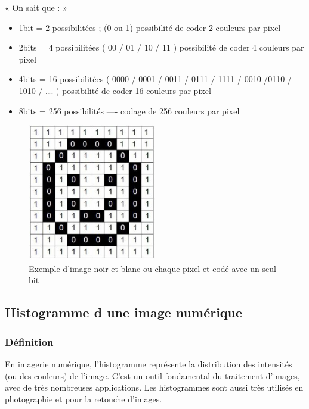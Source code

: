 \documentclass[a4paper,12pt]{report}
\begin{document}
« On sait que : »
\begin{itemize}
	\item 1bit = 2 possibilitées ; (0 ou 1) possibilité de coder 2 couleurs par pixel\\
	\item 2bits = 4 possibilitées ( 00 / 01 / 10 / 11 ) possibilité de coder 4 couleurs par pixel\\
	\item 4bits = 16 possibilitées ( 0000 / 0001 / 0011 / 0111 / 1111 / 0010 /0110 / 1010 /  …. ) possibilité de coder 16 couleurs par pixel\\
	\item 8bits = 256 possibilités —- codage de 256 couleurs par pixel\\
\end{itemize}

\begin{figure}[ht]
	\centering
	\includegraphics[width=0.5\textwidth]{zero one.jpg}
	\caption{Exemple d’image noir et blanc ou chaque pixel et codé avec un seul bit}
	\label{fig:zero.and.one}
\end{figure}

\subsection*{Histogramme d une image numérique}
\subsubsection*{Définition }
En imagerie numérique, l’histogramme représente la distribution des intensités (ou des couleurs) de l'image. C'est un outil fondamental du traitement d'images, avec de très nombreuses applications. Les histogrammes sont aussi très utilisés en photographie et pour la retouche d'images.\\
\end{document}
